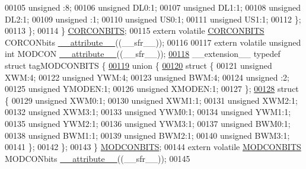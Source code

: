 \begin{DoxyCode}
00105       \textcolor{keywordtype}{unsigned} :8;
00106       \textcolor{keywordtype}{unsigned} DL0:1;
00107       \textcolor{keywordtype}{unsigned} DL1:1;
00108       \textcolor{keywordtype}{unsigned} DL2:1;
00109       \textcolor{keywordtype}{unsigned} :1;
00110       \textcolor{keywordtype}{unsigned} US0:1;
00111       \textcolor{keywordtype}{unsigned} US1:1;
00112     \};
00113   \};
00114 \} \hyperlink{a00014_d0/dc3/a00354}{CORCONBITS};
00115 \textcolor{keyword}{extern} \textcolor{keyword}{volatile} \hyperlink{a00014_d0/dc3/a00354}{CORCONBITS} CORCONbits \hyperlink{a00015_a493c46f03454991ccc5aa7a6e1dfb2a7}{\_\_attribute\_\_}((\_\_sfr\_\_));
00116 
00117 \textcolor{keyword}{extern} \textcolor{keyword}{volatile} \textcolor{keywordtype}{unsigned} \textcolor{keywordtype}{int}  MODCON \hyperlink{a00015_a493c46f03454991ccc5aa7a6e1dfb2a7}{\_\_attribute\_\_}((\_\_sfr\_\_));
\hypertarget{a00015_source_l00118}{}\hyperlink{a00014}{00118} \_\_extension\_\_ \textcolor{keyword}{typedef} \textcolor{keyword}{struct }tagMODCONBITS \{
\hypertarget{a00015_source_l00119}{}\hyperlink{a00015}{00119}   \textcolor{keyword}{union }\{
\hypertarget{a00015_source_l00120}{}\hyperlink{a00015}{00120}     \textcolor{keyword}{struct }\{
00121       \textcolor{keywordtype}{unsigned} XWM:4;
00122       \textcolor{keywordtype}{unsigned} YWM:4;
00123       \textcolor{keywordtype}{unsigned} BWM:4;
00124       \textcolor{keywordtype}{unsigned} :2;
00125       \textcolor{keywordtype}{unsigned} YMODEN:1;
00126       \textcolor{keywordtype}{unsigned} XMODEN:1;
00127     \};
\hypertarget{a00015_source_l00128}{}\hyperlink{a00015}{00128}     \textcolor{keyword}{struct }\{
00129       \textcolor{keywordtype}{unsigned} XWM0:1;
00130       \textcolor{keywordtype}{unsigned} XWM1:1;
00131       \textcolor{keywordtype}{unsigned} XWM2:1;
00132       \textcolor{keywordtype}{unsigned} XWM3:1;
00133       \textcolor{keywordtype}{unsigned} YWM0:1;
00134       \textcolor{keywordtype}{unsigned} YWM1:1;
00135       \textcolor{keywordtype}{unsigned} YWM2:1;
00136       \textcolor{keywordtype}{unsigned} YWM3:1;
00137       \textcolor{keywordtype}{unsigned} BWM0:1;
00138       \textcolor{keywordtype}{unsigned} BWM1:1;
00139       \textcolor{keywordtype}{unsigned} BWM2:1;
00140       \textcolor{keywordtype}{unsigned} BWM3:1;
00141     \};
00142   \};
00143 \} \hyperlink{a00014_d7/dd2/a00598}{MODCONBITS};
00144 \textcolor{keyword}{extern} \textcolor{keyword}{volatile} \hyperlink{a00014_d7/dd2/a00598}{MODCONBITS} MODCONbits \hyperlink{a00015_a493c46f03454991ccc5aa7a6e1dfb2a7}{\_\_attribute\_\_}((\_\_sfr\_\_));
00145 

\end{DoxyCode}
